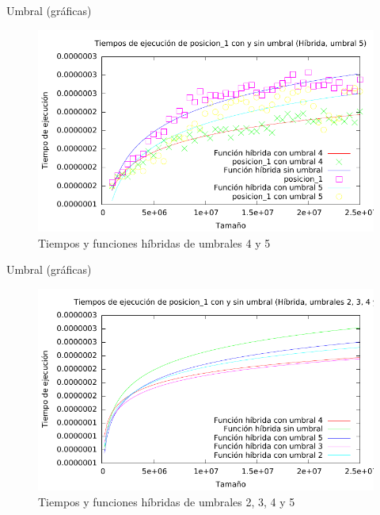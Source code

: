 \begin{frame}{Umbral (gráficas)}
\begin{figure}[H]\includegraphics[width=13cm]{img/posicion_1_comparativa_umbral2.pdf} \centering
	\caption{Tiempos y funciones híbridas de umbrales 4 y 5}\end{figure}
\end{frame}

\begin{frame}{Umbral (gráficas)}
\begin{figure}[H]\includegraphics[width=13cm]{img/posicion_1_comparativa_umbral5.pdf} \centering
	\caption{Tiempos y funciones híbridas de umbrales 2, 3, 4 y 5}\end{figure}
\end{frame}


